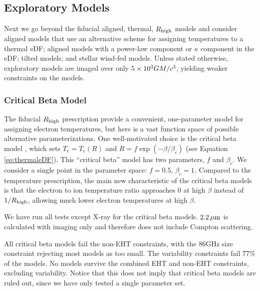 \subsection{Exploratory Models}\label{sec:explore}

Next we go beyond the fiducial aligned, thermal, $R_\mathrm{high}$ models and consider aligned models that use an alternative scheme for assigning temperatures to a thermal eDF; aligned models with a power-law component or $\kappa$ component in the eDF; tilted models; and stellar wind-fed models.
Unless stated otherwise, exploratory models are imaged over only $5 \times 10^3 GM/c^3$, yielding weaker constraints on the models.

\subsubsection{Critical Beta Model}

The fiducial $R_\mathrm{high}$ prescription provide a convenient, one-parameter model for assigning electron temperatures, but here is a vast function space of possible alternative parameterizations.
One well-motivated choice is the critical beta model \citep{2020MNRAS.493.1404A}, which sets $T_e = T_e(R)$ and $R = f \exp(-\beta/\beta_c)$ (see Equation \ref{eq:thermaleDF}).
This ``critical beta'' model has two parameters, $f$ and $\beta_c$.
We consider a single point in the parameter space: $f = 0.5$, $\beta_c = 1$.
Compared to the \Rh temperature prescription, the main new characteristic of the critical beta models is that the electron to ion temperature ratio approaches 0 at high $\beta$ instead of $1/R_\mathrm{high}$, allowing much lower electron temperatures at high $\beta$.

We have run all tests except X-ray for the critical beta models.
$2.2\,\mu\mathrm{m}$ is calculated with imaging only and therefore does not include Compton scattering.

All critical beta models fail the non-EHT constraints, with the 86GHz size constraint rejecting most models as too small.
The variability constraints fail $77\%$ of the models.
No models survive the combined EHT and non-EHT constraints, excluding variability.
Notice that this does not imply that critical beta models are ruled out, since we have only tested a single parameter set.

